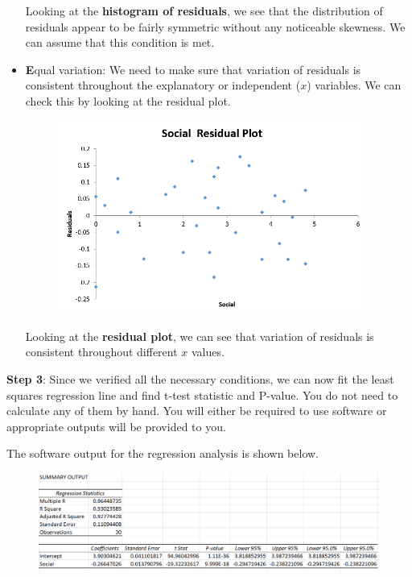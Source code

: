 \documentclass[12pt]{article}
\begin{document}
\begin{itemize}
	Looking at the \textbf{histogram of residuals}, we see that the distribution of residuals appear to be fairly symmetric without any noticeable skewness. We can assume that this condition is met.
	
	\item \textbf{E}qual variation: We need to make sure that variation of residuals is consistent throughout the explanatory or independent ($x$) variables. We can check this by looking at the residual plot.
	
	\begin{figure}[!h]
		\centering
		\vspace{-10 pt}
		\includegraphics[width=10cm]{Figures/fig11.png}
		\vspace{-10 pt}
	\end{figure}
	
	Looking at the \textbf{residual plot}, we can see that variation of residuals is consistent throughout different $x$ values.
\end{itemize}

\vspace{10 pt}

\noindent \textbf{Step 3}: Since we verified all the necessary conditions, we can now fit the least squares regression line and find t-test statistic and P-value. You do not need to calculate any of them by hand. You will either be required to use software or appropriate outputs will be provided to you.

The software output for the regression analysis is shown below.

\begin{figure}[!h]
	\centering
	\vspace{-5 pt}
	\includegraphics[width=\linewidth]{Figures/fig12.png}
	\vspace{-15 pt}
\end{figure}
\end{document}
